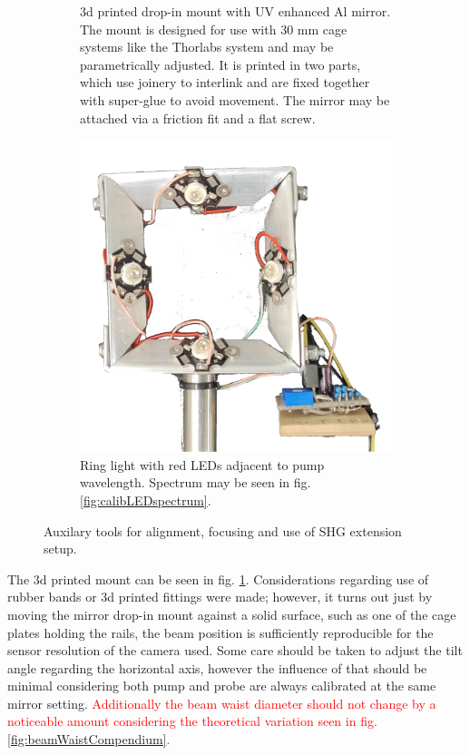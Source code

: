 \documentclass[twoside,openright]{scrreprt}
\begin{document}
\begin{figure}[hbtp]
\begin{subfigure}[t]{0.66\textwidth}
\begin{subfigure}[t]{0.45\columnwidth}
\end{subfigure}
\caption{3d printed drop-in mount with UV enhanced Al mirror.
The mount is designed for use with 30 mm cage systems like the Thorlabs system and may be parametrically adjusted.
It is printed in two parts, which use joinery to interlink and are fixed together with super-glue to avoid movement.
The mirror may be attached via a friction fit and a flat screw.\label{fig:drop-in-Mirror-mount}}
\end{subfigure}
\hfill
\centering
\begin{subfigure}[t]{0.3\textwidth}
\centering
\includegraphics[width=\columnwidth]{images/TAM/RingLightFrontFree.png}
\caption{Ring light with red LEDs adjacent to pump wavelength. Spectrum may be seen in fig. \ref{fig:calibLEDspectrum}.\label{fig:ringLight}}
\end{subfigure}
\caption{Auxilary tools for alignment, focusing and use of SHG extension setup.}
\end{figure}


The 3d printed mount can be seen in fig. \ref{fig:drop-in-Mirror-mount}.
Considerations regarding use of rubber bands or 3d printed fittings were made; however, it turns out just by moving the mirror drop-in mount against a solid surface, such as one of the cage plates holding the rails, the beam position is sufficiently reproducible for the sensor resolution of the camera used. Some care should be taken to adjust the tilt angle regarding the horizontal axis, however the influence of that should be minimal considering both pump and probe are always calibrated at the same mirror setting. \textcolor{red}{Additionally the beam waist diameter should not change by a noticeable amount considering the theoretical variation seen in fig. \ref{fig:beamWaistCompendium}.}\\
\end{document}
